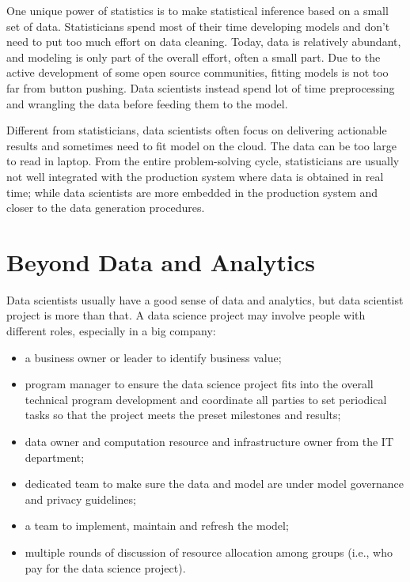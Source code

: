 \documentclass[12pt,]{krantz}
\providecommand{\tightlist}{%
  \setlength{\itemsep}{0pt}\setlength{\parskip}{0pt}}
\begin{document}
One unique power of statistics is to make statistical inference based on a small set of data. Statisticians spend most of their time developing models and don't need to put too much effort on data cleaning. Today, data is relatively abundant, and modeling is only part of the overall effort, often a small part. Due to the active development of some open source communities, fitting models is not too far from button pushing. Data scientists instead spend lot of time preprocessing and wrangling the data before feeding them to the model.

Different from statisticians, data scientists often focus on delivering actionable results and sometimes need to fit model on the cloud. The data can be too large to read in laptop. From the entire problem-solving cycle, statisticians are usually not well integrated with the production system where data is obtained in real time; while data scientists are more embedded in the production system and closer to the data generation procedures.

\hypertarget{beyond-data-and-analytics}{%
\section{Beyond Data and Analytics}\label{beyond-data-and-analytics}}

Data scientists usually have a good sense of data and analytics, but data scientist project is more than that. A data science project may involve people with different roles, especially in a big company:

\begin{itemize}
\tightlist
\item
  a business owner or leader to identify business value;
\item
  program manager to ensure the data science project fits into the overall technical program development and coordinate all parties to set periodical tasks so that the project meets the preset milestones and results;
\item
  data owner and computation resource and infrastructure owner from the IT department;
\item
  dedicated team to make sure the data and model are under model governance and privacy guidelines;
\item
  a team to implement, maintain and refresh the model;
\item
  multiple rounds of discussion of resource allocation among groups (i.e., who pay for the data science project).
\end{itemize}
\end{document}
